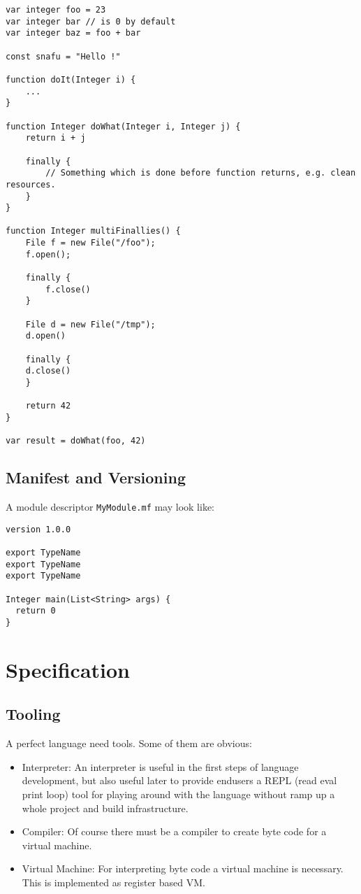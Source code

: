 \documentclass[a4paper,12pt]{article}
\begin{document}
\begin{verbatim}
var integer foo = 23
var integer bar // is 0 by default
var integer baz = foo + bar

const snafu = "Hello !"

function doIt(Integer i) {
    ...
}

function Integer doWhat(Integer i, Integer j) {
    return i + j
    
    finally {
    	// Something which is done before function returns, e.g. clean resources.
    }
}

function Integer multiFinallies() {
    File f = new File("/foo");
    f.open();
    
    finally {
        f.close()
    }
    
    File d = new File("/tmp");
    d.open()
    
    finally {
    d.close()
    }
    
    return 42
}

var result = doWhat(foo, 42)	
\end{verbatim}

\subsection{Manifest and Versioning}

A module descriptor \verb|MyModule.mf| may look like:

\begin{verbatim}
version 1.0.0

export TypeName
export TypeName
export TypeName

Integer main(List<String> args) {
  return 0
}
\end{verbatim}

\section{Specification}

\subsection{Tooling}

A perfect language need tools. Some of them are obvious:

\begin{itemize}
	\item Interpreter: An interpreter is useful in the first steps of language development, but also useful later to provide endusers a REPL (read eval print loop) tool for playing around with the language without ramp up a whole project and build infrastructure.
	\item Compiler: Of course there must be a compiler to create byte code for a virtual machine.
	\item Virtual Machine: For interpreting byte code a virtual machine is necessary. This is implemented as register based VM.
\end{itemize}
\end{document}
